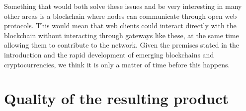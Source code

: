 Something that would both solve these issues and be very interesting in many other areas is a blockchain where nodes can communicate through open web protocols. This would mean that web clients could interact directly with the blockchain without interacting through gateways like these, at the same time allowing them to contribute to the network. Given the premises stated in the introduction and the rapid development of emerging blockchains and cryptocurrencies, we think it is only a matter of time before this happens.

\section{Quality of the resulting product}



